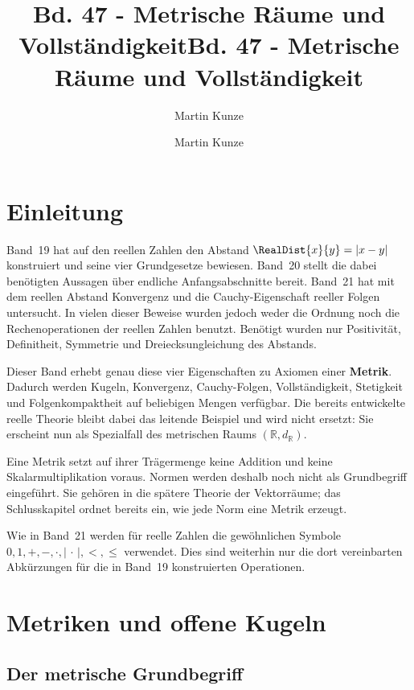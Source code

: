 \documentclass[main.tex]{subfiles}
\title{Bd. 47 - Metrische Räume und Vollständigkeit}
\author{Martin Kunze}
\date{}
\begin{document}
\title{Bd. 47 - Metrische Räume und Vollständigkeit}
\author{Martin Kunze}
\date{}
\hypersetup{pageanchor=false}
\maketitle
\hypersetup{pageanchor=true}
\setcounter{tocdepth}{3}
\tableofcontents
\setcounter{file}{47}
\renewcommand{\FormulaBandID}{47}

\chapter{Einleitung}

Band~19 hat auf den reellen Zahlen den Abstand
\(\RealDist{x}{y}=|x-y|\) konstruiert und seine vier Grundgesetze bewiesen.
Band~20 stellt die dabei benötigten Aussagen über endliche Anfangsabschnitte
bereit. Band~21 hat mit dem reellen Abstand Konvergenz und die
Cauchy-Eigenschaft reeller Folgen untersucht. In vielen dieser Beweise wurden
jedoch weder die Ordnung noch die Rechenoperationen der reellen Zahlen
benutzt. Benötigt wurden nur Positivität, Definitheit, Symmetrie und
Dreiecksungleichung des Abstands.

Dieser Band erhebt genau diese vier Eigenschaften zu Axiomen einer
\textbf{Metrik}. Dadurch werden Kugeln, Konvergenz, Cauchy-Folgen,
Vollständigkeit, Stetigkeit und Folgenkompaktheit auf beliebigen Mengen
verfügbar. Die bereits entwickelte reelle Theorie bleibt dabei das leitende
Beispiel und wird nicht ersetzt: Sie erscheint nun als Spezialfall des
metrischen Raums \((\mathbb R,d_{\mathbb R})\).

Eine Metrik setzt auf ihrer Trägermenge keine Addition und keine
Skalarmultiplikation voraus. Normen werden deshalb noch nicht als
Grundbegriff eingeführt. Sie gehören in die spätere Theorie der Vektorräume;
das Schlusskapitel ordnet bereits ein, wie jede Norm eine Metrik erzeugt.

Wie in Band~21 werden für reelle Zahlen die gewöhnlichen Symbole
\(0,1,+,-,\cdot,|\,\cdot\,|,<,\leq\) verwendet. Dies sind weiterhin nur die
dort vereinbarten Abkürzungen für die in Band~19 konstruierten Operationen.

\chapter{Metriken und offene Kugeln}

\section{Der metrische Grundbegriff}
\end{document}
